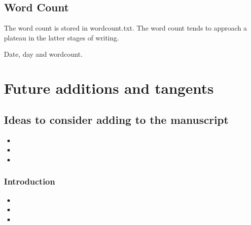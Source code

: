 \documentclass[10pt,letterpaper]{article}
\newcommand{\bi}{\begin{itemize}}
\newcommand{\ei}{\end{itemize}}
\begin{document}
\subsection{Word Count}
\label{sub:wordcount}

The word count is stored in wordcount.txt.
The word count tends to approach a plateau in the latter stages of writing.

\begin{figure}[htp!]
  \centering
\end{figure}

\begin{table}[ht]
  \centering
  \caption{Date, day and wordcount.}
  \label{tab:my_label}
\end{table}


\section{Future additions and tangents}
\label{sec:future}


\subsection{Ideas to consider adding to the manuscript}
\label{subsec:new-ideas}

\bi
    \item  
    \item  
    \item  
\ei


\subsubsection{Introduction}
\label{ssubsec:new-ideas:Intro}


\bi
    \item  
    \item  
    \item  
\ei
\end{document}
